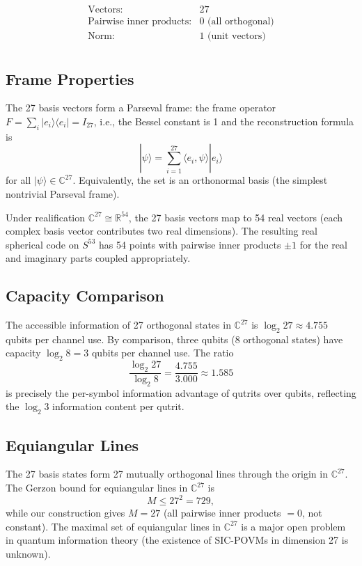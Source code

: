 \documentclass[12pt,a4paper]{article}
\begin{document}
\[
\begin{array}{ll}
\text{Vectors:} & 27 \\
\text{Pairwise inner products:} & 0 \text{ (all orthogonal)} \\
\text{Norm:} & 1 \text{ (unit vectors)} \\
\end{array}
\]

\subsection{Frame Properties}

The 27 basis vectors form a Parseval frame: the frame operator
$F = \sum_i |e_i\rangle\langle e_i| = I_{27}$, i.e., the Bessel constant
is 1 and the reconstruction formula is
\[
|\psi\rangle = \sum_{i=1}^{27} \langle e_i, \psi \rangle |e_i\rangle
\]
for all $|\psi\rangle \in \mathbb{C}^{27}$. Equivalently, the set is an
orthonormal basis (the simplest nontrivial Parseval frame).

Under realification $\mathbb{C}^{27} \cong \mathbb{R}^{54}$, the 27 basis
vectors map to 54 real vectors (each complex basis vector contributes
two real dimensions). The resulting real spherical code on $S^{53}$ has
54 points with pairwise inner products $\pm 1$ for the real and imaginary
parts coupled appropriately.

\subsection{Capacity Comparison}

The accessible information of 27 orthogonal states in $\mathbb{C}^{27}$
is $\log_2 27 \approx 4.755$ qubits per channel use. By comparison, three
qubits (8 orthogonal states) have capacity $\log_2 8 = 3$ qubits per
channel use. The ratio
\[
\frac{\log_2 27}{\log_2 8} = \frac{4.755}{3.000} \approx 1.585
\]
is precisely the per-symbol information advantage of qutrits over qubits,
reflecting the $\log_2 3$ information content per qutrit.

\subsection{Equiangular Lines}

The 27 basis states form 27 mutually orthogonal lines through the origin
in $\mathbb{C}^{27}$. The Gerzon bound for equiangular lines in
$\mathbb{C}^{27}$ is
\[
M \le 27^2 = 729,
\]
while our construction gives $M = 27$ (all pairwise inner products $= 0$,
not constant). The maximal set of equiangular lines in $\mathbb{C}^{27}$
is a major open problem in quantum information theory (the existence of
SIC-POVMs in dimension 27 is unknown).
\end{document}
